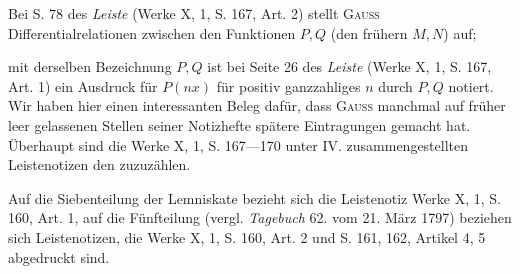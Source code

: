 Bei S. 78 des \textit{Leiste} (Werke X, 1, S. 167, Art. 2) stellt \textsc{Gauss} Differentialrelationen
zwischen den Funktionen \(P,Q\) (den frühern \(M,N\)) auf;\par
\clearpage{}
\noindent mit derselben Bezeichnung \(P,Q\) ist bei Seite 26 des \textit{Leiste} (Werke X, 1,
S. 167, Art. 1) ein Ausdruck für \(P(nx)\) für positiv ganzzahliges \(n\) durch
\(P,Q\) notiert. Wir haben hier einen interessanten Beleg dafür, dass \textsc{Gauss}
manchmal auf früher leer gelassenen Stellen seiner Notizhefte spätere Eintragungen
gemacht hat. Überhaupt sind die Werke X, 1, S. 167—170 unter
IV. zusammengestellten Leistenotizen den  zuzuzählen.

Auf die Siebenteilung der Lemniskate bezieht sich die Leistenotiz Werke
X, 1, S. 160, Art. 1, auf die Fünfteilung (vergl. \textit{Tagebuch} 62. vom 21. März
1797) beziehen sich Leistenotizen, die Werke X, 1, S. 160, Art. 2 und S. 161,
162, Artikel 4, 5 abgedruckt sind.

